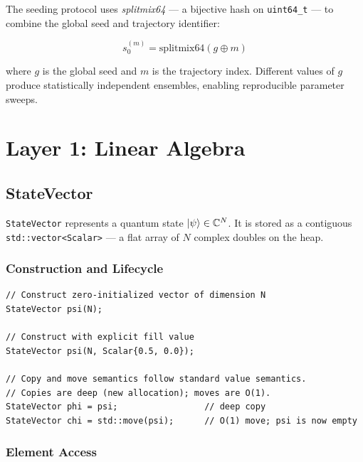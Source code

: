 \documentclass[11pt,a4paper,twoside]{book}
\newcommand{\complex}{\mathbb{C}}
\newcommand{\code}[1]{\texttt{\small#1}}
\theoremstyle{definition}
\theoremstyle{remark}
\begin{document}
The seeding protocol uses \emph{splitmix64} — a bijective hash on
\code{uint64\_t} — to combine the global seed and trajectory identifier:

\begin{equation}
  s_0^{(m)} = \mathrm{splitmix64}(g \oplus m)
  \label{eq:seed}
\end{equation}

where $g$ is the global seed and $m$ is the trajectory index.
Different values of $g$ produce statistically independent ensembles,
enabling reproducible parameter sweeps.

\chapter{Layer 1: Linear Algebra}
\label{chap:linalg}

\section{StateVector}
\label{sec:statevector}

\code{StateVector} represents a quantum state $\ket{\psi} \in \complex^N$.
It is stored as a contiguous \code{std::vector<Scalar>} — a flat array
of $N$ complex doubles on the heap.

\subsection{Construction and Lifecycle}
\label{subsec:sv-construction}

\begin{verbatim}
// Construct zero-initialized vector of dimension N
StateVector psi(N);

// Construct with explicit fill value
StateVector psi(N, Scalar{0.5, 0.0});

// Copy and move semantics follow standard value semantics.
// Copies are deep (new allocation); moves are O(1).
StateVector phi = psi;                 // deep copy
StateVector chi = std::move(psi);      // O(1) move; psi is now empty
\end{verbatim}

\subsection{Element Access}
\label{subsec:sv-access}
\end{document}
